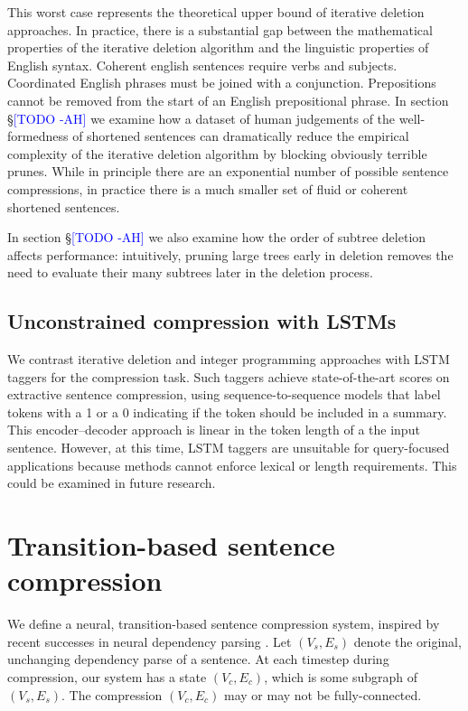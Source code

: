 \documentclass[11pt,a4paper]{article}
\newcommand{\ahcomment}[1]{\textcolor{blue}{[#1 -AH]}}
\begin{document}
This worst case represents the theoretical upper bound of iterative deletion approaches. In practice, there is a substantial gap between the mathematical properties of the iterative deletion algorithm and the linguistic properties of English syntax. Coherent english sentences require verbs and subjects. Coordinated English phrases must be joined with a conjunction. Prepositions cannot be removed from the start of an English prepositional phrase. In section \S\ahcomment{TODO} we examine how a dataset of human judgements of the well-formedness of shortened sentences can dramatically reduce the empirical complexity of the iterative deletion algorithm by blocking obviously terrible prunes. While in principle there are an exponential number of possible sentence compressions, in practice there is a much smaller set of fluid or coherent shortened sentences. 

In section \S\ahcomment{TODO} we also examine how the order of subtree deletion affects performance: intuitively, pruning large trees early in deletion removes the need to evaluate their many subtrees later in the deletion process.

\subsection{Unconstrained compression with LSTMs}

We contrast iterative deletion and integer programming approaches with LSTM taggers for the compression task. Such taggers achieve state-of-the-art scores on extractive sentence compression, using sequence-to-sequence models that label tokens with a 1 or a 0 indicating if the token should be included in a summary. This encoder--decoder approach is linear in the token length of a the input sentence. However, at this time, LSTM taggers are unsuitable for query-focused applications because methods cannot enforce lexical or length requirements. This could be examined in future research.

\section{Transition-based sentence compression}

We define a neural, transition-based sentence compression system, inspired by recent successes in neural dependency parsing \cite{D14-1082}. Let ${(V_s,E_s)}$ denote the original, unchanging dependency parse of a sentence. At each timestep during compression, our system has a state ${(V_c,E_c)}$, which is some subgraph of ${(V_s,E_s)}$. The compression ${(V_c,E_c)}$ may or may not be fully-connected. 
\end{document}
